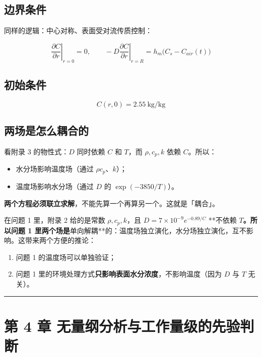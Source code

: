 \subsection{边界条件}


同样的逻辑：中心对称、表面受对流传质控制：


\begin{equation}
\left.\frac{\partial C}{\partial r}\right|_{r=0}=0,\qquad
-D\left.\frac{\partial C}{\partial r}\right|_{r=R}=h_m\big(C_s-C_{air}(t)\big)\tag{3.3}
\end{equation}


\subsection{初始条件}


\begin{equation}
C(r,0)=2.55\ \mathrm{kg/kg}\tag{3.4}
\end{equation}


\subsection{两场是怎么耦合的}


看附录 3 的物性式：$D$ 同时依赖 $C$ 和 $T$，而 $\rho,c_p,k$ 依赖 $C$。所以：


\begin{itemize}
\item 水分场影响温度场（通过 $\rho c_p$、$k$）；
\item 温度场影响水分场（通过 $D$ 的 $\exp(-3850/T)$）。
\end{itemize}


\textbf{两个方程必须联立求解}，不能先算一个再算另一个。这就是「耦合」。


在问题 1 里，附录 2 给的是常数 $\rho,c_p,k$，且 $D=7\times10^{-9}e^{-0.89/C}$ **不依赖 $T$\textbf{。所以问题 1 里两个场是}单向解耦**的：温度场独立演化，水分场独立演化，互不影响。这带来两个方便的推论：


\begin{enumerate}
\item 问题 1 的温度场可以单独验证；
\item 问题 1 里的环境处理方式\textbf{只影响表面水分浓度}，不影响温度（因为 $D$ 与 $T$ 无关）。
\end{enumerate}


\vspace{1mm}\hrule\vspace{1mm}


\section{第 4 章 无量纲分析与工作量级的先验判断}


